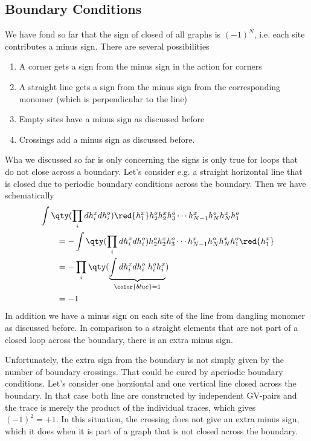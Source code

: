 \subsection{Boundary Conditions}
We have fond so far that the sign of closed of all graphs is $(-1)^{N}$, i.e. each site contributes a
minus sign. There are several possibilities
\begin{enumerate}
	\item A corner gets a sign from the minus sign in the action for corners
	\item A straight line gets a sign from the minus sign from the corresponding monomer (which is perpendicular to the line)
	\item Empty sites have a minus sign as discussed before
	\item Crossings add a minus sign as discussed before.
\end{enumerate}
Wha we discussed so far is only  concerning the signs is only true for loops that do not close 
across a boundary.
Let's consider e.g. a straight horizontal line that is closed due to periodic boundary conditions across the boundary. Then we have schematically
%
\begin{align*}
&
\int \qty(\prod_{i} d\hdag{i} d\hnag{i})  \red{ \hdag{1}}\hnag{2}\hdag{2}\hnag{3} \cdots \hdag{N-1}\hnag{N}\hdag{N}\hnag{1} \\
&\qquad = 
- \int \qty(\prod_{i} d\hdag{i} d\hnag{i})   \hnag{2}\hdag{2}\hnag{3} \cdots \hdag{N-1}\hnag{N}\hdag{N}\hnag{1} \red{\hdag{1}}\\
&\qquad = 
-\prod_{i} \qty(\underbrace{
\int d\hdag{i} d\hnag{i} \; \hnag{i}\hdag{i}
}_{\color{blue} = 1})\\
&\qquad = - 1
\end{align*}
% 
In addition we have a minus sign on each site of the line from dangling monomer 
as discussed before. In comparison to a straight elements that are not part of a  closed loop across the boundary, there is an extra minus sign.

Unfortunately, the extra sign from the boundary is not simply given by the number of boundary crossings. That could be cured by aperiodic boundary conditions. 
Let's consider one horziontal and one vertical line closed across the boundary.
In that case both line are constructed by independent GV-pairs and the trace is merely the product of the individual traces, which gives $(-1)^{2}=+1$. In this situation, the crossing
does not give an extra minus sign, which it does when it is part of a graph that is not closed
across the boundary.

